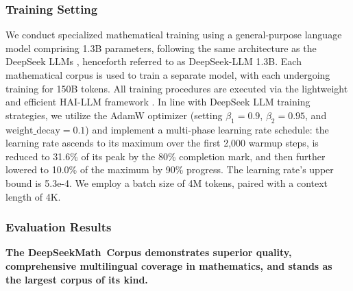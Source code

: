 \subsubsection{Training Setting}
\label{sec:quality-policy}
We conduct specialized mathematical training using a general-purpose language model comprising 1.3B parameters, following the same architecture as the DeepSeek LLMs \citep{deepseek-llm}, henceforth referred to as DeepSeek-LLM 1.3B. Each mathematical corpus is used to train a separate model, with each undergoing training for 150B tokens. All training procedures are executed via the lightweight and efficient HAI-LLM framework \citep{haillm}. In line with DeepSeek LLM training strategies, we utilize the AdamW optimizer \citep{adamW} (setting $\beta_1=0.9$, $\beta_2=0.95$, and $\mathrm{weight\_decay}=0.1$) and implement a multi-phase learning rate schedule: the learning rate ascends to its maximum over the first 2,000 warmup steps, is reduced to 31.6\% of its peak by the 80\% completion mark, and then further lowered to 10.0\% of the maximum by 90\% progress. The learning rate's upper bound is 5.3e-4. We employ a batch size of 4M tokens, paired with a context length of 4K.

\subsubsection{Evaluation Results}

\textbf{The DeepSeekMath~Corpus demonstrates superior quality, comprehensive multilingual coverage in mathematics, and stands as the largest corpus of its kind.}

